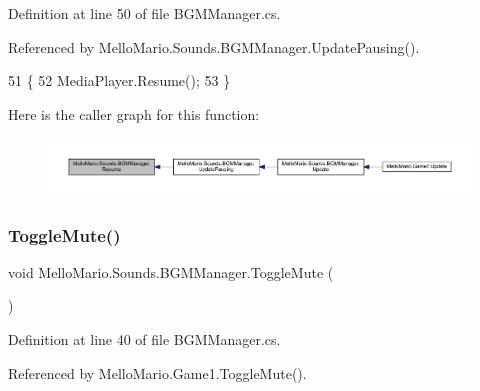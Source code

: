 Definition at line 50 of file B\+G\+M\+Manager.\+cs.



Referenced by Mello\+Mario.\+Sounds.\+B\+G\+M\+Manager.\+Update\+Pausing().


\begin{DoxyCode}
51         \{
52             MediaPlayer.Resume();
53         \}
\end{DoxyCode}
Here is the caller graph for this function\+:
\nopagebreak
\begin{figure}[H]
\begin{center}
\leavevmode
\includegraphics[width=350pt]{classMelloMario_1_1Sounds_1_1BGMManager_a8c1ad558e3c5de4cdc6b8615c9f73a7e_icgraph}
\end{center}
\end{figure}
\mbox{\label{classMelloMario_1_1Sounds_1_1BGMManager_a03b0abc9778ec42b8ed717453f78b01a}} 
\subsubsection{Toggle\+Mute()}
{\footnotesize\ttfamily void Mello\+Mario.\+Sounds.\+B\+G\+M\+Manager.\+Toggle\+Mute (\begin{DoxyParamCaption}{ }\end{DoxyParamCaption})}



Definition at line 40 of file B\+G\+M\+Manager.\+cs.



Referenced by Mello\+Mario.\+Game1.\+Toggle\+Mute().


